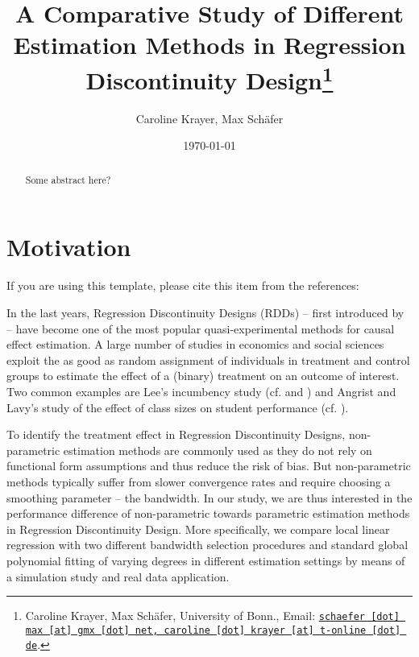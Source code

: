 \documentclass[11pt, a4paper, leqno]{article}
\numberwithin{equation}{section}
\numberwithin{figure}{section}
\numberwithin{table}{section}
\numberwithin{algorithm}{section}
\begin{document}
\title{A Comparative Study of Different Estimation Methods in Regression Discontinuity Design\thanks{Caroline Krayer, Max Schäfer, University of Bonn.,  Email: \href{mailto:schaefer.max@gmx.net, caroline.krayer@t-online.de}{\nolinkurl{schaefer [dot] max [at] gmx [dot] net, caroline [dot] krayer [at] t-online [dot] de}}.}}

\author{Caroline Krayer, Max Schäfer}

\date{\today}

\maketitle


\begin{abstract}
	Some abstract here?
\end{abstract}
\thispagestyle{empty}
\addtocounter{page}{-1}
\clearpage

\section{Motivation} %
\label{sec:motivation}

If you are using this template, please cite this item from the references: \citet{GaudeckerEconProjectTemplates}

In the last years, Regression Discontinuity Designs (RDDs) -- first introduced by \cite{thistlethwaite_campbell} -- have become one of the most popular quasi-experimental methods for causal effect estimation. A large number of studies in economics and social sciences exploit the as good as random assignment of individuals in treatment and control groups to estimate the effect of a (binary) treatment on an outcome of interest. Two common examples are Lee's incumbency study (cf. \cite{lee_2001} and \cite{lee_2007})
and Angrist and Lavy's study of the effect of class sizes on student performance (cf. \cite{angrist_lavy}).

To identify the treatment effect in Regression Discontinuity Designs, non-parametric estimation methods are commonly used as they do not rely on functional form assumptions and thus reduce the risk of bias. But non-parametric methods typically suffer from slower convergence rates and require choosing a smoothing parameter -- the bandwidth. In our study, we are thus interested in the performance difference of non-parametric towards parametric estimation methods in Regression Discontinuity Design. More specifically, we compare local linear regression with two different bandwidth selection procedures and standard global polynomial fitting of varying degrees in different estimation settings by means of a simulation study and real data application.
\end{document}
